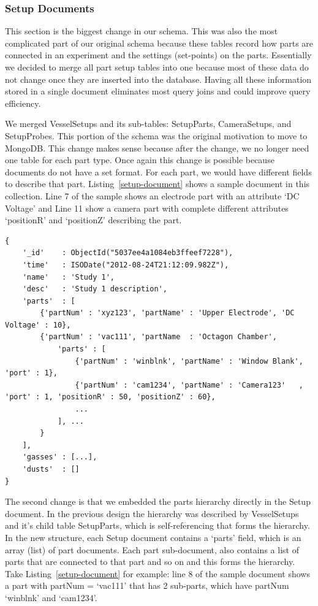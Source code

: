 \subsubsection{Setup Documents}

This section is the biggest change in our schema. This was also the most complicated part of our original schema because these tables record how parts are connected in an experiment and the settings (set-points) on the parts. Essentially we decided to merge all part setup tables into one because most of these data do not change once they are inserted into the database. Having all these information stored in a single document eliminates most query joins and could improve query efficiency.

We merged VesselSetups and its sub-tables: SetupParts, CameraSetups, and SetupProbes. This portion of the schema was the original motivation to move to MongoDB. This change makes sense because after the change, we no longer need one table for each part type. Once again this change is possible because documents do not have a set format. For each part, we would have different fields to describe that part. Listing~\ref{setup-document} shows a sample document in this collection. Line 7 of the sample shows an electrode part with an attribute `DC Voltage' and Line 11 show a camera part with complete different attributes `positionR' and `positionZ' describing the part.

\begin{lstlisting}[float,caption=Sample document for the Setup collection, label=setup-document]
{
    '_id'    : ObjectId("5037ee4a1084eb3ffeef7228"),
    'time'   : ISODate("2012-08-24T21:12:09.982Z"),
    'name'   : 'Study 1',
    'desc'   : 'Study 1 description',
    'parts'  : [
        {'partNum' : 'xyz123', 'partName' : 'Upper Electrode', 'DC Voltage' : 10},
        {'partNum' : 'vac111', 'partName  : 'Octagon Chamber',
            'parts' : [
                {'partNum' : 'winblnk', 'partName' : 'Window Blank', 'port' : 1},
                {'partNum' : 'cam1234', 'partName' : 'Camera123'   , 'port' : 1, 'positionR' : 50, 'positionZ' : 60},
                ...
            ], ...
        }
    ],
    'gasses' : [...],
    'dusts'  : []
}
\end{lstlisting}

The second change is that we embedded the parts hierarchy directly in the Setup document. In the previous design the hierarchy was described by VesselSetups and it's child table SetupParts, which is self-referencing that forms the hierarchy. In the new structure, each Setup document contains a `parts' field, which is an array (list) of part documents. Each part sub-document, also contains a list of parts that are connected to that part and so on and this forms the hierarchy. Take Listing~\ref{setup-document} for example: line 8 of the sample document shows a part with partNum = `vac111' that has 2 sub-parts, which have partNum `winblnk' and `cam1234'.
 
